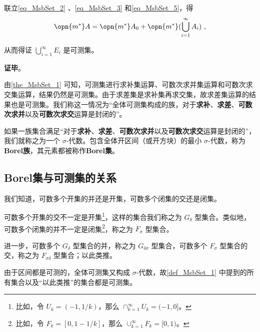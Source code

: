 联立\autoref{eq_MsbSet_2} 、\autoref{eq_MsbSet_3} 和\autoref{eq_MsbSet_5}，得
\begin{equation}
\opn{m^*}A=\opn{m^*}A_0+\opn{m^*}(\bigcup_{i=1}^\infty A_i)~,
\end{equation}

从而得证 $\bigcup_{i=1}^\infty E_i$ 是可测集。




\textbf{证毕}。


由\autoref{the_MsbSet_1} 可知，可测集进行求补集运算、可数次求并集运算和可数次求交集运算，结果仍然是可测集。由于求差集是求补集再求交集，故求差集运算的结果也是可测集。我们称这一情况为“全体可测集构成的族，对于\textbf{求补}、\textbf{求差}、\textbf{可数次求并}以及\textbf{可数次求交}运算是封闭的”。

\begin{definition}{}
如果一族集合满足“对于\textbf{求补}、\textbf{求差}、\textbf{可数次求并}以及\textbf{可数次求交}运算是封闭的”，我们就称之为一个 $\sigma$-代数。包含全体开区间（或开方块）的最小 $\sigma$-代数，称为\textbf{Borel族}，其元素都被称作\textbf{Borel集}。
\end{definition}


\subsection{Borel集与可测集的关系}

\begin{definition}{}

我们知道，可数多个开集的并还是开集，可数多个闭集的交还是闭集。

可数多个开集的交不一定是开集\footnote{比如，令 $U_k=(-1, 1/k)$，那么 $\cap_{k=1}^\infty U_k=(-1, 0]$。}，这样的集合我们称之为 $G_\delta$ 型集合\cite{十一五实变函数论}。类似地，可数多个闭集的并不一定是闭集\footnote{比如，令 $F_k=[0, 1-1/k]$，那么 $\cup_{k=1}^\infty F_k=[0, 1)$。}，称之为 $F_\sigma$ 型集合。

进一步，可数多个 $G_\delta$ 型集合的并，称之为 $G_{\delta\sigma}$ 型集合，可数多个 $F_\sigma$ 型集合的交，称之为 $F_{\sigma\delta}$ 型集合；以此类推。

\end{definition}

由于区间都是可测的，全体可测集又构成 $\sigma$-代数，故\autoref{def_MsbSet_1} 中提到的所有集合以及“以此类推”的集合都是可测集。




